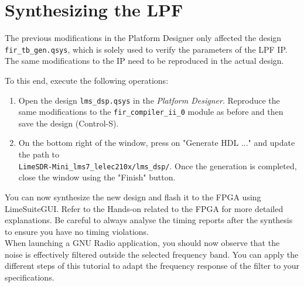\section{Synthesizing the LPF}

The previous modifications in the Platform Designer only affected the design \texttt{fir\_tb\_gen.qsys}, which is solely used to verify the parameters of the LPF IP. The same modifications to the IP need to be reproduced in the actual design.

To this end, execute the following operations:
\begin{enumerate}
    \item Open the design \texttt{lms\_dsp.qsys} in the \textit{Platform Designer}. Reproduce the same modifications to the \texttt{fir\_compiler\_ii\_0} module as before and then save the design (Control-S).
    \item On the bottom right of the window, press on "Generate HDL ..." and update the path to \\
    \texttt{LimeSDR-Mini\_lms7\_lelec210x/lms\_dsp/}. Once the generation is completed, close the window using the "Finish" button.
\end{enumerate}

You can now synthesize the new design and flash it to the FPGA using LimeSuiteGUI. Refer to the Hands-on related to the FPGA for more detailed explanations. Be careful to always analyse the timing reports after the synthesis to ensure you have no timing violations. \\


When launching a GNU Radio application, you should now observe that the noise is effectively filtered outside the selected frequency band. You can apply the different steps of this tutorial to adapt the frequency response of the filter to your specifications.
